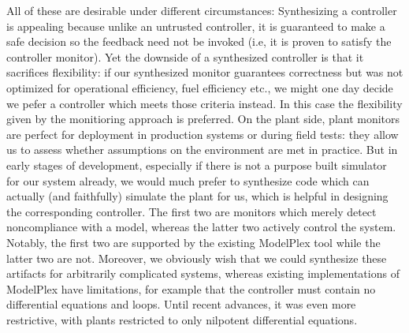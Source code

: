 \documentclass[12pt]{cmuthesis}
\theoremstyle{definition}
\theoremstyle{remark}
\newcommand{\ModelPlex}{ModelPlex\xspace}
\begin{document}
All of these are desirable under different circumstances:
Synthesizing a controller is appealing because unlike an untrusted controller, it is guaranteed to make a safe decision so the feedback need not be invoked (i.e, it is proven to satisfy the controller monitor).
Yet the downside of a synthesized controller is that it sacrifices flexibility: if our synthesized monitor guarantees correctness but was not optimized for operational efficiency, fuel efficiency etc., we might one day decide we pefer a controller which meets those criteria instead.
In this case the flexibility given by the monitioring approach is preferred.
On the plant side, plant monitors are perfect for deployment in production systems or during field tests: they allow us to assess whether assumptions on the environment are met in practice.
But in early stages of development, especially if there is not a purpose built simulator for our system already, we would much prefer to synthesize code which can actually (and faithfully) simulate the plant for us, which is helpful in designing the corresponding controller.
The first two are monitors which merely detect noncompliance with a model, whereas the latter two actively control the system.
Notably, the first two are supported by the existing \ModelPlex tool while the latter two are not.
Moreover, we obviously wish that we could synthesize these artifacts for arbitrarily complicated systems, whereas existing implementations of \ModelPlex have limitations, for example that the controller must contain no differential equations and loops.
Until recent advances, it was even more restrictive, with plants restricted to only nilpotent differential equations.
\end{document}
